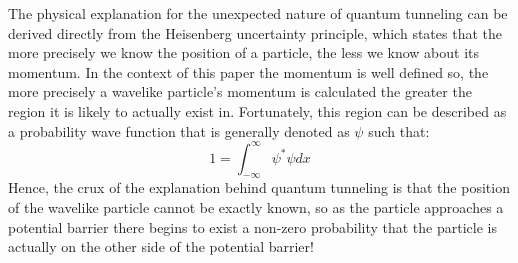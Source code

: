 \documentclass[twocolumn]{article}
\begin{document}
	The physical explanation for the unexpected nature of quantum tunneling can be derived directly from the Heisenberg uncertainty principle, which states that the more precisely we know the position of a particle, the less we know about its momentum. In the context of this paper the momentum is well defined so, the more precisely a wavelike particle's momentum is calculated the greater the region it is likely to actually exist in. Fortunately, this region can be described as a probability wave function that is generally denoted as $\psi$ such that:
\begin{equation}
	1=\int_{-\infty}^{\infty} \psi^* \psi dx
\end{equation}
Hence, the crux of the explanation behind quantum tunneling is that the position of the wavelike particle cannot be exactly known, so as the particle approaches a potential barrier there begins to exist a non-zero probability that the particle is actually on the other side of the potential barrier!
\end{document}
